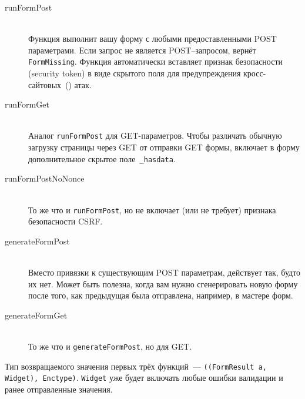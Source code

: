 \begin{description}
    \item[runFormPost] \hfill \\
        Функция выполнит вашу форму с любыми предоставленными POST
        параметрами. Если запрос не является POST--запросом, вернёт
        \lstinline'FormMissing'. Функция автоматически вставляет признак
        безопасности (security token) в виде скрытого поля для предупреждения
        кросс-сайтовых~()
        атак.

    \item[runFormGet] \hfill \\
        Аналог \lstinline'runFormPost' для GET-параметров. Чтобы различать
        обычную загрузку страницы через GET от отправки GET формы, включает в
        форму дополнительное скрытое поле~\lstinline'_hasdata'.

    \item[runFormPostNoNonce] \hfill \\
        То же что и \lstinline'runFormPost', но не включает (или не требует)
        признака безопасности CSRF.

    \item[generateFormPost] \hfill \\
        Вместо привязки к существующим POST параметрам, действует так, будто
        их нет. Может быть полезна, когда вам нужно сгенерировать новую форму
        после того, как предыдущая была отправлена, например, в мастере форм.

    \item[generateFormGet] \hfill \\
        То же что и \lstinline'generateFormPost', но для GET.
\end{description}

Тип возвращаемого значения первых трёх функций~---
\lstinline'((FormResult a, Widget), Enctype)'.  \lstinline'Widget' уже будет
включать любые ошибки валидации и ранее отправленные значения.

